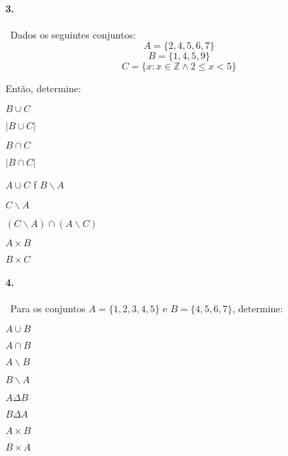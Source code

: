 \paragraph{3.}~Dados os seguintes conjuntos: \[A=\{2,4,5,6,7\}\] \[B=\{1,4,5,9\}\]
  \[C=\{x:x\in \mathbb{Z}\land 2\leq x<5\}\]

\noindent Então, determine:

\begin{enumerate}
\def\labelenumi{\alph{enumi}.}
	\begin{minipage}{.5\textwidth}
		\item  \(B\cup C\)
		\item  \(|B\cup C|\)
		\item  \(B\cap C\)
		\item  \(|B\cap C|\)
	\end{minipage}
	\begin{minipage}{.5\textwidth}
		\item  \(A\cup C\) f \(B\backslash A\)
		\item  \(C\backslash A\)
		\item  \((C\backslash A)\cap (A\backslash C)\)
		\item  \(A\times B\)
		\item  \(B\times C\)
	\end{minipage}
\end{enumerate}

\paragraph{4.}~Para os conjuntos \(A=\{1,2,3,4,5\}\) e \(B=\{4,5,6,7\}\), determine:

\begin{enumerate}
\def\labelenumi{\alph{enumi}.}
	\begin{minipage}{.5\textwidth}
		\item  \(A\cup B\)
		\item  \(A\cap B\)
		\item  \(A\backslash B\)
		\item  \(B\backslash A\)
	\end{minipage}
	\begin{minipage}{.5\textwidth}
		\item  \(A\Delta B\)
		\item  \(B\Delta A\)
		\item  \(A\times B\)
		\item  \(B\times A\)
	\end{minipage}
\end{enumerate}

